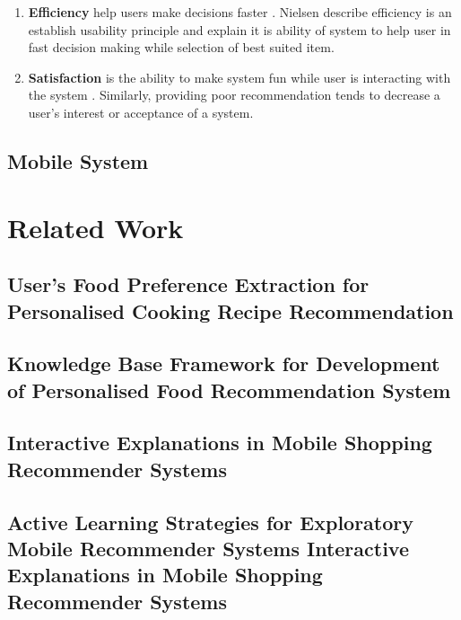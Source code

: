 \begin{enumerate}
	\item \textbf{Efficiency} help users make decisions faster \cite{tintarev2007survey}. Nielsen describe efficiency is an establish usability principle and explain it is ability of system to help user in fast decision making while selection of best suited item\cite{nielsen1990heuristic}.
	
	\item \textbf{Satisfaction} is the ability to make system fun while user is interacting with the system \cite{tintarev2007survey}. Similarly, providing poor recommendation tends to decrease a user’s interest \cite{ tanaka2000multi} or acceptance of a system\cite{herlocker2000explaining}.
	
\end{enumerate}

\subsection{Mobile System}


\section{Related Work}

\subsection{User's Food Preference Extraction for Personalised Cooking Recipe Recommendation}

\subsection{Knowledge Base Framework for Development of Personalised Food Recommendation System}

\subsection{Interactive Explanations in Mobile Shopping Recommender Systems}

\subsection{Active Learning Strategies for Exploratory Mobile Recommender Systems Interactive Explanations in Mobile Shopping Recommender Systems}
